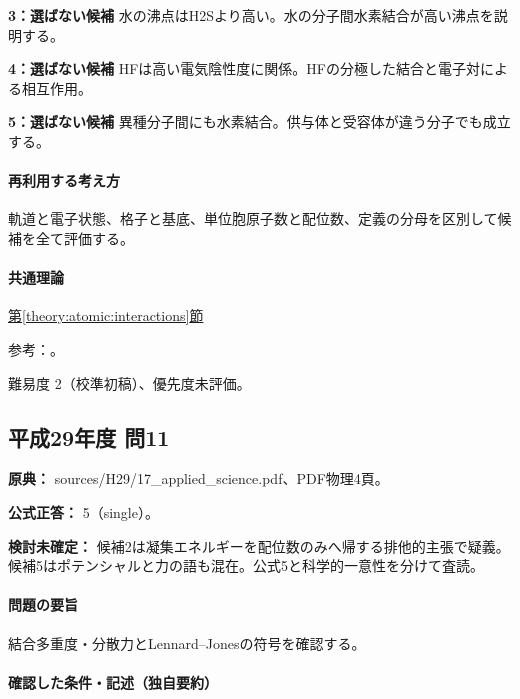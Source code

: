 \noindent\textbf{3：選ばない候補} 水の沸点はH2Sより高い。水の分子間水素結合が高い沸点を説明する。\par

\noindent\textbf{4：選ばない候補} HFは高い電気陰性度に関係。HFの分極した結合と電子対による相互作用。\par

\noindent\textbf{5：選ばない候補} 異種分子間にも水素結合。供与体と受容体が違う分子でも成立する。\par

\paragraph{再利用する考え方} 軌道と電子状態、格子と基底、単位胞原子数と配位数、定義の分母を区別して候補を全て評価する。

\paragraph{共通理論} \hyperref[theory:atomic:interactions]{第\ref*{theory:atomic:interactions}節}

\par 参考：\cite{atomic_nonbond}。

\par 難易度 2（校準初稿）、優先度未評価。

\subsection{平成29年度 問11}
\label{q:h29-reg-applied-11}

\noindent\textbf{原典：} sources/H29/17\_applied\_science.pdf、PDF物理4頁。

\textbf{公式正答：} 5（single）。

\par\textbf{検討未確定：} 候補2は凝集エネルギーを配位数のみへ帰する排他的主張で疑義。候補5はポテンシャルと力の語も混在。公式5と科学的一意性を分けて査読。

\paragraph{問題の要旨} 結合多重度・分散力とLennard–Jonesの符号を確認する。

\paragraph{確認した条件・記述（独自要約）}\mbox{}\par

